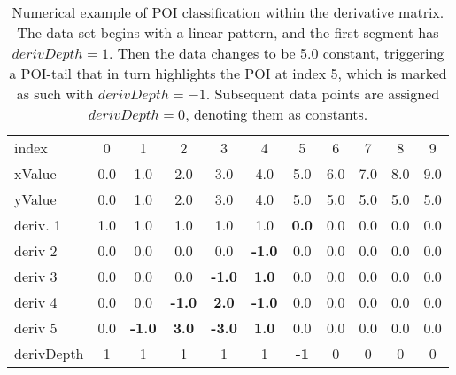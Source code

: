 \documentclass[main.tex]{subfiles}
\begin{document}
  
  \begin{table}[h]
    \caption{Numerical example of POI classification within the derivative matrix. The data set begins with a linear pattern, and the first segment has $derivDepth=1$. Then the data changes to be 5.0 constant, triggering a POI-tail that in turn highlights the POI at index 5, which is marked as such with $derivDepth=-1$. Subsequent data points are assigned $derivDepth=0$, denoting them as constants.}
    \centering
    \begin{tabularx}{0.85\textwidth}{ X | c c c c c c c c c c }
      index & 0 & 1 & 2 & 3 & 4 & 5 & 6 & 7 & 8 & 9 \\
      xValue & 0.0 & 1.0 & 2.0 & 3.0 & 4.0 & 5.0 & 6.0 & 7.0 & 8.0 & 9.0 \\
      \hline \hline
      yValue & 0.0 & 1.0 & 2.0 & 3.0 & 4.0 & 5.0 & 5.0 &  5.0 & 5.0 & 5.0 \\
      \hline
      deriv. 1 & 1.0 & 1.0 & 1.0 & 1.0 & 1.0 & \textbf{0.0} & 0.0 & 0.0 & 0.0 & 0.0 \\
      deriv 2 & 0.0 & 0.0 & 0.0 & 0.0 & \textbf{-1.0} & 0.0 & 0.0 & 0.0 & 0.0 & 0.0 \\
      deriv 3 & 0.0 & 0.0 & 0.0 & \textbf{-1.0} & \textbf{1.0} & 0.0 & 0.0 & 0.0 & 0.0 & 0.0 \\   
      deriv 4 & 0.0 & 0.0 & \textbf{-1.0} & \textbf{2.0} & \textbf{-1.0} & 0.0 & 0.0 & 0.0 & 0.0 & 0.0 \\  
      deriv 5 & 0.0 & \textbf{-1.0} & \textbf{3.0} & \textbf{-3.0} & \textbf{1.0} & 0.0 & 0.0 & 0.0 & 0.0 & 0.0\\
      \hline
      derivDepth & 1 & 1 & 1 & 1 & 1 & \textbf{-1} & 0 & 0 & 0 & 0 \\   
    \end{tabularx}
    \label{tbl:mtrx:poi}
  \end{table}
\end{document}
